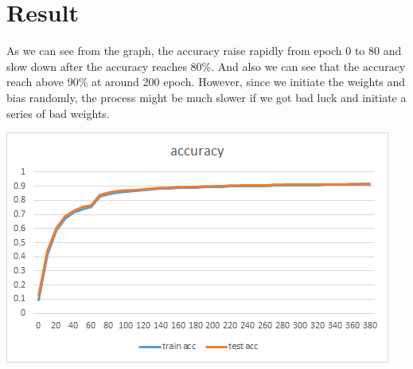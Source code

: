 \documentclass[12pt]{article}
\begin{document}
\section{Result}
As we can see from the graph, the accuracy raise rapidly from epoch 0 to 80 and slow down after 
the accuracy reaches 80\%. And also we can see that the accuracy reach above 90\% at around 200
 epoch. However, since we initiate the weights and bias randomly, the process might be much 
 slower if we got bad luck and initiate a series of bad weights.
 \begin{center}
     \includegraphics[scale=1]{accuracy.png}
 \end{center}
\end{document}
